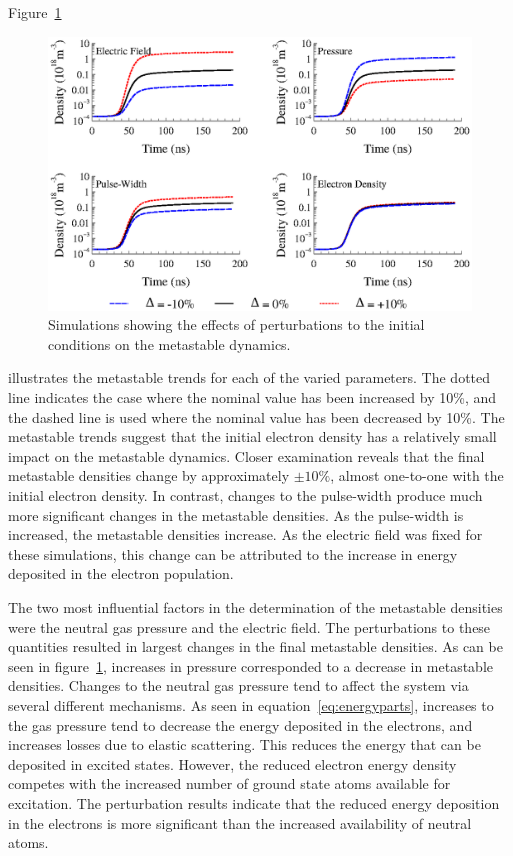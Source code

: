 Figure~\ref{fig:perturbed}
\begin{figure}
  \centering
  \includegraphics{./chapters/modeling/figures/perturbed.eps}
  \caption{Simulations showing the effects of perturbations to the initial
  conditions on the metastable dynamics.}
  \label{fig:perturbed}
\end{figure}
illustrates the metastable trends for each of the varied parameters. The dotted
line indicates the case where the nominal value has been increased by 10\%, and
the dashed line is used where the nominal value has been decreased by 10\%. The
metastable trends suggest that the initial electron density has a relatively
small impact on the metastable dynamics. Closer examination reveals that the
final metastable densities change by approximately $\pm10\%$, almost one-to-one
with the initial electron density. In contrast, changes to the pulse-width
produce much more significant changes in the metastable densities. As the
pulse-width is increased, the metastable densities increase. As the electric
field was fixed for these simulations, this change can be attributed to the
increase in energy deposited in the electron population.

The two most influential factors in the determination of the metastable
densities were the neutral gas pressure and the electric field. The
perturbations to these quantities resulted in largest changes in the final
metastable densities. As can be seen in figure~\ref{fig:perturbed}, increases in
pressure corresponded to a decrease in metastable densities. Changes to the
neutral gas pressure tend to affect the system via several different mechanisms.
As seen in equation~\ref{eq:energyparts}, increases to the gas pressure tend to
decrease the energy deposited in the electrons, and increases losses due to
elastic scattering. This reduces the energy that can be deposited in excited
states. However, the reduced electron energy density competes with the increased
number of ground state atoms available for excitation. The perturbation results
indicate that the reduced energy deposition in the electrons is more significant
than the increased availability of neutral atoms.

